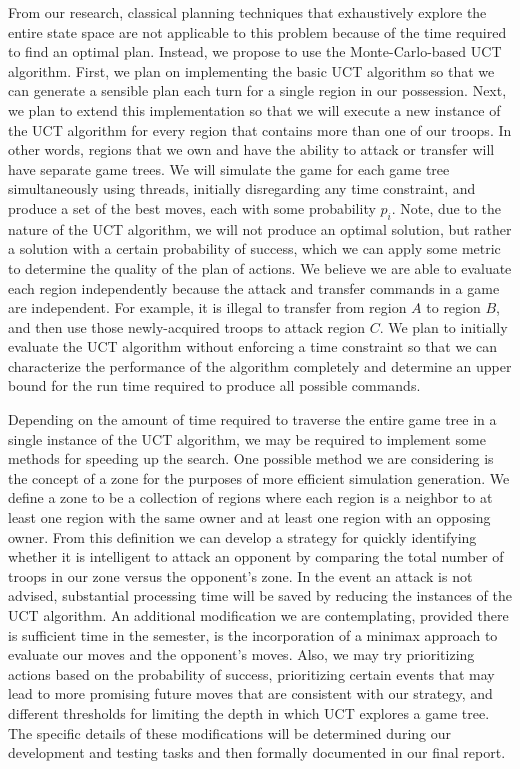 \documentclass[a4paper,11pt]{article}
\begin{document}
From our research, classical planning techniques that exhaustively explore the entire state space are not applicable to this problem because of the time required to find an optimal plan. Instead, we propose to use the Monte-Carlo-based UCT algorithm.  First, we plan on implementing the basic UCT algorithm so that we can generate a sensible plan each turn for a single region in our possession.  Next, we plan to extend this implementation so that we will execute a new instance of the UCT algorithm for every region that contains more than one of our troops.  In other words, regions that we own and have the ability to attack or transfer will have separate game trees. We will simulate the game for each game tree simultaneously using threads, initially disregarding any time constraint, and produce a set of the best moves, each with some probability $p_{i}$. Note, due to the nature of the UCT algorithm, we will not produce an optimal solution, but rather a solution with a certain probability of success, which we can apply some metric to determine the quality of the plan of actions. We believe we are able to evaluate each region independently because the attack and transfer commands in a game are independent. For example, it is illegal to transfer from region $A$ to region $B$, and then use those newly-acquired troops to attack region $C$. We plan to initially evaluate the UCT algorithm without enforcing a time constraint so that we can characterize the performance of the algorithm completely and determine an upper bound for the run time required to produce all possible commands. 

Depending on the amount of time required to traverse the entire game tree in a single instance of the UCT algorithm, we may be required to implement some methods for speeding up the search. One possible method we are considering is the concept of a zone for the purposes of more efficient simulation generation.  We define a zone to be a collection of regions where each region is a neighbor to at least one region with the same owner and at least one region with an opposing owner.  From this definition we can develop a strategy for quickly identifying whether it is intelligent to attack an opponent by comparing the total number of troops in our zone versus the opponent's zone.  In the event an attack is not advised, substantial processing time will be saved by reducing the instances of the UCT algorithm.  An additional modification we are contemplating, provided there is sufficient time in the semester, is the incorporation of a minimax approach to evaluate our moves and the opponent's moves.  Also, we may try prioritizing actions based on the probability of success, prioritizing certain events that may lead to more promising future moves that are consistent with our strategy, and different thresholds for limiting the depth in which UCT explores a game tree. The specific details of these modifications will be determined during our development and testing tasks and then formally documented in our final report.
\end{document}
